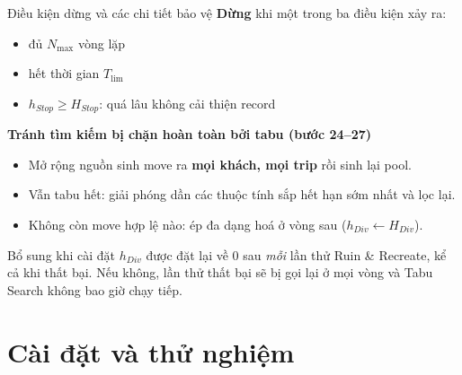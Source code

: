 \documentclass[aspectratio=169]{beamer}
\newcommand{\hl}[1]{\textcolor{blue!60!black}{\textbf{#1}}}
\begin{document}
\begin{frame}{Điều kiện dừng và các chi tiết bảo vệ}
  \textbf{Dừng} khi một trong ba điều kiện xảy ra:
  \begin{itemize}
    \item \small đủ $N_{\max}$ vòng lặp
    \item \small hết thời gian $T_{\lim}$
    \item \small $h_{Stop} \ge H_{Stop}$: quá lâu không cải thiện record
  \end{itemize}

  \vspace{2mm}
  \textbf{Tránh tìm kiếm bị chặn hoàn toàn bởi tabu (bước 24–27)}
  \begin{itemize}
    \item \small Mở rộng nguồn sinh move ra \hl{mọi khách, mọi trip} rồi sinh lại pool.
    \item \small Vẫn tabu hết: giải phóng dần các thuộc tính sắp hết hạn sớm nhất và lọc lại.
    \item \small Không còn move hợp lệ nào: ép đa dạng hoá ở vòng sau ($h_{Div} \leftarrow H_{Div}$).
  \end{itemize}

  \vspace{2mm}
  \begin{alertblock}{Bổ sung khi cài đặt}
    \small $h_{Div}$ được đặt lại về 0 sau \emph{mỗi} lần thử Ruin \& Recreate, kể cả khi thất bại. Nếu không, lần thử thất bại sẽ bị gọi lại ở mọi vòng và Tabu Search không bao giờ chạy tiếp.
  \end{alertblock}
\end{frame}

\section{Cài đặt và thử nghiệm}
\end{document}
